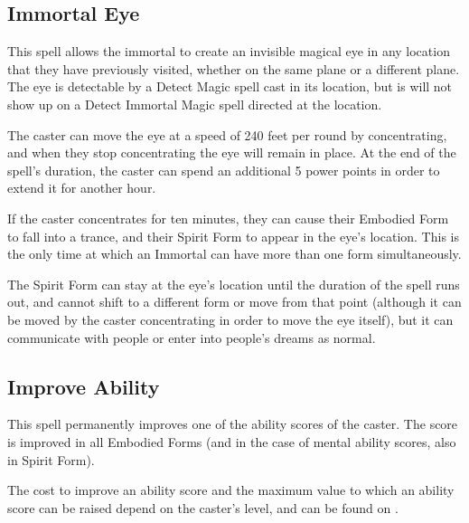 \begin{multicols*}{2}
\subsection{Immortal Eye}\label{spell:Immortal Eye}

This spell allows the immortal to create an invisible magical eye in any location that they have previously visited, whether on the same plane or a different plane. The eye is detectable by a Detect Magic spell cast in its location, but is will not show up on a Detect Immortal Magic spell directed at the location.

The caster can move the eye at a speed of 240 feet per round by concentrating, and when they stop concentrating the eye will remain in place. At the end of the spell’s duration, the caster can spend an additional 5 power points in order to extend it for another hour.

If the caster concentrates for ten minutes, they can cause their Embodied Form to fall into a trance, and their Spirit Form to appear in the eye’s location. This is the only time at which an Immortal can have more than one form simultaneously.

The Spirit Form can stay at the eye’s location until the duration of the spell runs out, and cannot shift to a different form or move from that point (although it can be moved by the caster concentrating in order to move the eye itself), but it can communicate with people or enter into people’s dreams as normal.

\subsection{Improve Ability}

This spell permanently improves one of the ability scores of the caster. The score is improved in all Embodied Forms (and in the case of mental ability scores, also in Spirit Form).

The cost to improve an ability score and the maximum value to which an ability score can be raised depend on the caster’s level, and can be found on .


\end{multicols*}

